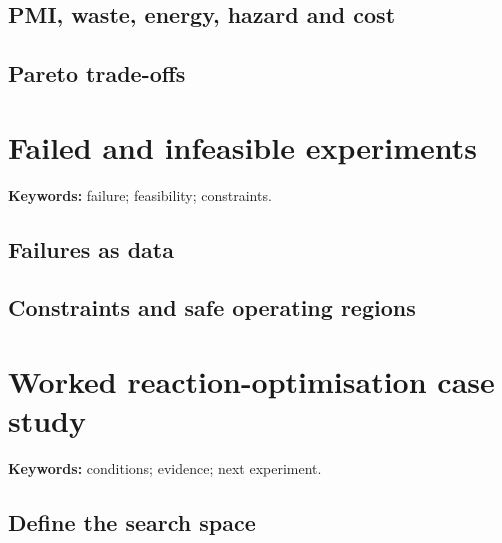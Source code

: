 
\subsection{PMI, waste, energy, hazard and cost}


\subsection{Pareto trade-offs}


\section{Failed and infeasible experiments}

\begin{warningbox}
\textbf{Keywords:} failure; feasibility; constraints.
\end{warningbox}

\subsection{Failures as data}


\subsection{Constraints and safe operating regions}


\section{Worked reaction-optimisation case study}

\begin{resultbox}
\textbf{Keywords:} conditions; evidence; next experiment.
\end{resultbox}

\subsection{Define the search space}

